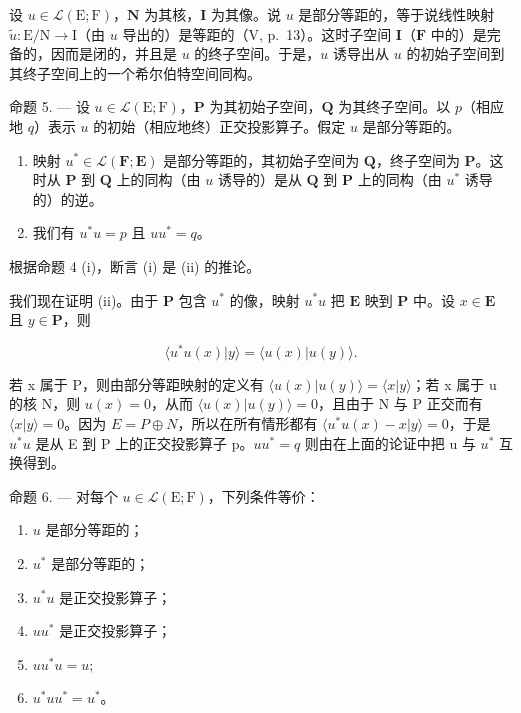 设 \(u \in \mathcal{L}(\mathrm{E};\mathrm{F})\)，\(\mathbf{N}\) 为其核，\(\mathbf{I}\) 为其像。说 \(u\) 是部分等距的，等于说线性映射 \(\tilde{u}: \mathrm{E/N} \to \mathrm{I}\)（由 \(u\) 导出的）是等距的（V, p.~13）。这时子空间 \(\mathbf{I}\)（\(\mathbf{F}\) 中的）是完备的，因而是闭的，并且是 \(u\) 的终子空间。于是，\(u\) 诱导出从 \(u\) 的初始子空间到其终子空间上的一个希尔伯特空间同构。

命题 5. --- 设 \(u \in \mathcal{L}(\mathrm{E};\mathrm{F})\)，\(\mathbf{P}\) 为其初始子空间，\(\mathbf{Q}\) 为其终子空间。以 \(p\)（相应地 \(q\)）表示 \(u\) 的初始（相应地终）正交投影算子。假定 \(u\) 是部分等距的。

\begin{enumerate}
\def\labelenumi{(\roman{enumi})}
\item
  映射 \(u^{*} \in \mathcal{L}(\mathbf{F};\mathbf{E})\) 是部分等距的，其初始子空间为 \(\mathbf{Q}\)，终子空间为 \(\mathbf{P}\)。这时从 \(\mathbf{P}\) 到 \(\mathbf{Q}\) 上的同构（由 \(u\) 诱导的）是从 \(\mathbf{Q}\) 到 \(\mathbf{P}\) 上的同构（由 \(u^{*}\) 诱导的）的逆。
\item
  我们有 \(u^{*}u = p\) 且 \(uu^{*} = q\)。
\end{enumerate}

根据命题 4 (i)，断言 (i) 是 (ii) 的推论。

我们现在证明 (ii)。由于 \(\mathbf{P}\) 包含 \(u^{*}\) 的像，映射 \(u^{*}u\) 把 \(\mathbf{E}\) 映到 \(\mathbf{P}\) 中。设 \(x \in \mathbf{E}\) 且 \(y \in \mathbf{P}\)，则

\[
\langle u ^ {*} u (x) | y \rangle = \langle u (x) | u (y) \rangle .
\]

若 x 属于 P，则由部分等距映射的定义有 \(\langle u(x)|u(y)\rangle = \langle x|y\rangle\)；若 x 属于 u 的核 N，则 \(u(x) = 0\)，从而 \(\langle u(x)|u(y)\rangle = 0\)，且由于 N 与 P 正交而有 \(\langle x|y\rangle = 0\)。因为 \(E = P \oplus N\)，所以在所有情形都有 \(\langle u^{*}u(x) - x|y\rangle = 0\)，于是 \(u^{*}u\) 是从 E 到 P 上的正交投影算子 p。\(uu^{*} = q\) 则由在上面的论证中把 u 与 \(u^{*}\) 互换得到。

命题 6. --- 对每个 \(u \in \mathcal{L}(\mathrm{E};\mathrm{F})\)，下列条件等价：

\begin{enumerate}
\def\labelenumi{(\roman{enumi})}
\item
  \(u\) 是部分等距的；
\item
  \(u^{*}\) 是部分等距的；
\item
  \(u^{*}u\) 是正交投影算子；
\item
  \(uu^{*}\) 是正交投影算子；
\item
  \(uu^{*}u = u;\)
\item
  \(u^{*}uu^{*} = u^{*}\)。
\end{enumerate}

